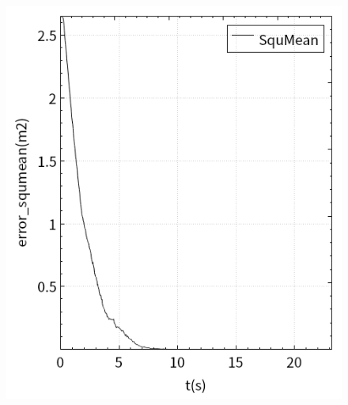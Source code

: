 \documentclass[fontset=fandol,type=bachelor,campus=harbin,bsmainpagenumberline=true]{hithesisbook}
\begin{document}
\begin{figure}[h]
{\begin{minipage}[h]{0.4\textwidth}
   		 	\includegraphics[width=1\textwidth]{chapter5/滑模控制器/error_squmean0}
    		\end{minipage}
		\label{视觉伺服曲线（滑模控制）b}
    	}
	\\ 
\end{figure}
\end{document}
